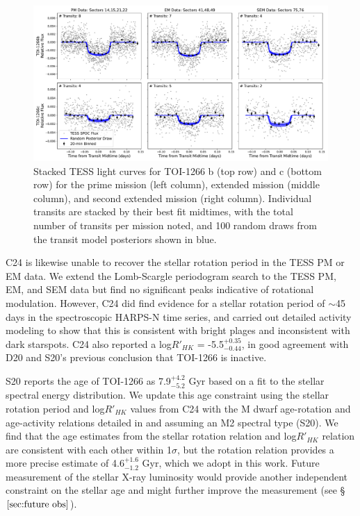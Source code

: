 \documentclass[twocolumn]{aastex631}
\begin{document}
\begin{figure}
\begin{center}
  \includegraphics[width=18cm]{1266_TESS_All_Transit_Fig.pdf}
  \caption{Stacked TESS light curves for TOI-1266 b (top row) and c (bottom row) for the prime mission (left column), extended mission (middle column), and second extended mission (right column). Individual transits are stacked by their best fit midtimes, with the total number of transits per mission noted, and 100 random draws from the transit model posteriors shown in blue.}
  \label{fig:TESS}
\end{center}
\end{figure}

C24 is likewise unable to recover the stellar rotation period in the TESS PM or EM data. We extend the Lomb-Scargle periodogram search to the TESS PM, EM, and SEM data but find no significant peaks indicative of rotational modulation. However, C24 did find evidence for a stellar rotation period of $\sim$45 days in the spectroscopic HARPS-N time series, and carried out detailed activity modeling to show that this is consistent with bright plages and inconsistent with dark starspots. C24 also reported a log$R'_{HK}$ = -5.5$^{+0.35}_{-0.44}$, in good agreement with D20 and S20's previous conclusion that TOI-1266 is inactive. 

S20 reports the age of TOI-1266 as 7.9$^{+4.2}_{-5.2}$ Gyr based on a fit to the stellar spectral energy distribution. We update this age constraint using the stellar rotation period and log$R'_{HK}$ values from C24 with the M dwarf age-rotation and age-activity relations detailed in \cite{Engle_Guinan_2023} and \cite{Engle2024} assuming an M2 spectral type (S20). We find that the age estimates from the stellar rotation relation and log$R'_{HK}$ relation are consistent with each other within 1$\sigma$, but the rotation relation provides a more precise estimate of 4.6$^{+1.6}_{-1.2}$ Gyr, which we adopt in this work. Future measurement of the stellar X-ray luminosity would provide another independent constraint on the stellar age \citep{Engle2024} and might further improve the measurement (see \S$\ref{sec:future obs}$).
\end{document}
